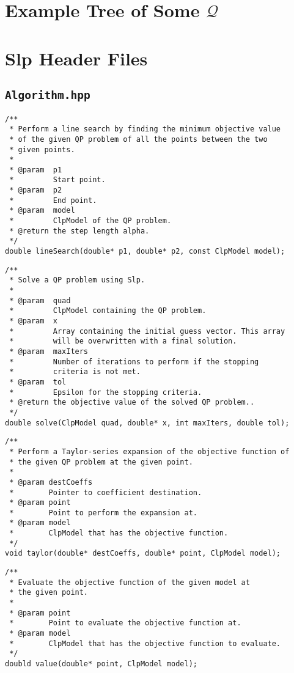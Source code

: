 \appendix
\chapter{Example Tree of Some $\mathcal{Q}$}
\label{app:tree}


\chapter{Slp Header Files}

\section*{\texttt{Algorithm.hpp}}
\begin{verbatim}
/**
 * Perform a line search by finding the minimum objective value
 * of the given QP problem of all the points between the two
 * given points.
 *
 * @param  p1
 *         Start point.
 * @param  p2
 *         End point.
 * @param  model
 *         ClpModel of the QP problem.
 * @return the step length alpha.
 */
double lineSearch(double* p1, double* p2, const ClpModel model);
\end{verbatim}

\begin{verbatim}
/**
 * Solve a QP problem using Slp.
 *
 * @param  quad
 *         ClpModel containing the QP problem.
 * @param  x
 *         Array containing the initial guess vector. This array
 *         will be overwritten with a final solution.
 * @param  maxIters
 *         Number of iterations to perform if the stopping
 *         criteria is not met.
 * @param  tol
 *         Epsilon for the stopping criteria.
 * @return the objective value of the solved QP problem..
 */
double solve(ClpModel quad, double* x, int maxIters, double tol);
\end{verbatim}

\newpage

\begin{verbatim}
/**
 * Perform a Taylor-series expansion of the objective function of
 * the given QP problem at the given point.
 *
 * @param destCoeffs
 *        Pointer to coefficient destination.
 * @param point
 *        Point to perform the expansion at.
 * @param model
 *        ClpModel that has the objective function.
 */
void taylor(double* destCoeffs, double* point, ClpModel model);
\end{verbatim}

\begin{verbatim}
/**
 * Evaluate the objective function of the given model at
 * the given point.
 *
 * @param point
 *        Point to evaluate the objective function at.
 * @param model
 *        ClpModel that has the objective function to evaluate.
 */
doubld value(double* point, ClpModel model);
\end{verbatim}
